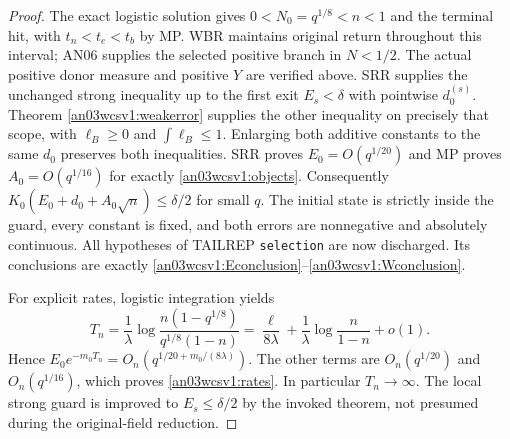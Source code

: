 \documentclass[11pt]{article}
\numberwithin{equation}{section}
\theoremstyle{remark}\newtheorem{remark}[theorem]{Remark}
\begin{document}
\begin{proof}
The exact logistic solution gives $0<N_0=q^{1/8}<n<1$ and the
terminal hit, with $t_n<t_e<t_b$ by MP.
WBR maintains original return throughout this interval; AN06
supplies the selected positive branch in $N<1/2$.
The actual positive donor measure and positive $Y$ are verified
above. SRR supplies the unchanged strong inequality up to the
first exit $E_s<\delta$ with pointwise $d_0^{(s)}$.
Theorem \ref{an03wcsv1:weakerror} supplies the other inequality
on precisely that scope, with $\ell_B\ge0$ and
$\int\ell_B\le1$. Enlarging both additive constants to the same
$d_0$ preserves both inequalities.
SRR proves $E_0=O(q^{1/20})$ and MP proves
$A_0=O(q^{1/16})$ for exactly \eqref{an03wcsv1:objects}.
Consequently
$K_0(E_0+d_0+A_0\sqrt n)\le\delta/2$ for small $q$.
The initial state is strictly inside the guard, every constant is
fixed, and both errors are nonnegative and absolutely continuous.
All hypotheses of TAILREP \texttt{selection} are now discharged.
Its conclusions are exactly
\eqref{an03wcsv1:Econclusion}--\eqref{an03wcsv1:Wconclusion}.

For explicit rates, logistic integration yields
\begin{equation}
 T_n=\frac1\lambda\log\frac{n(1-q^{1/8})}{q^{1/8}(1-n)}
 =\frac{\ell}{8\lambda}+\frac1\lambda\log\frac n{1-n}+o(1).
 \label{an03wcsv1:duration}
\end{equation}
Hence $E_0e^{-m_0T_n}=O_n(q^{1/20+m_0/(8\lambda)})$.
The other terms are $O_n(q^{1/20})$ and $O_n(q^{1/16})$,
which proves \eqref{an03wcsv1:rates}. In particular $T_n\to\infty$.
The local strong guard is improved to $E_s\le\delta/2$ by the
invoked theorem, not presumed during the original-field reduction.
\end{proof}
\end{document}
